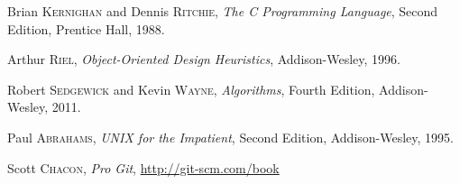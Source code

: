 \begin{thebibliography}{10}

Brian \textsc{Kernighan} and Dennis \textsc{Ritchie},
\emph{The C Programming Language},
Second Edition, Prentice Hall, 1988.

\medskip
{}
Arthur \textsc{Riel},
\emph{Object-Oriented Design Heuristics},
Addison-Wesley, 1996.

\medskip
{}
Robert \textsc{Sedgewick} and Kevin \textsc{Wayne},
\emph{Algorithms},
Fourth Edition, Addison-Wesley, 2011.

\medskip
{}
Paul \textsc{Abrahams},
\emph{UNIX for the Impatient},
Second Edition, Addison-Wesley, 1995.

\medskip
{}
Scott \textsc{Chacon},
\emph{Pro Git},
\url{http://git-scm.com/book}

\end{thebibliography}
